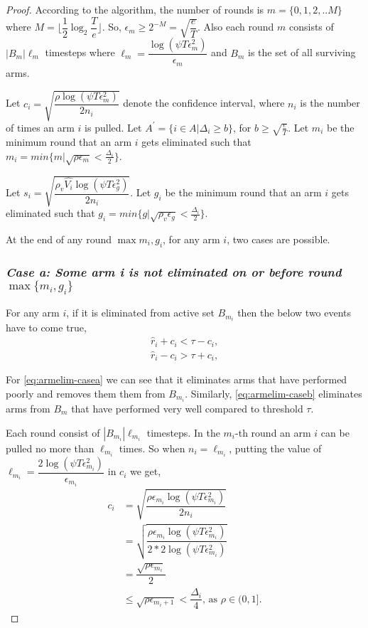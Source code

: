 \begin{proof}

According to the algorithm, the number of rounds is $m=\lbrace 0,1,2,.. M\rbrace $ where $M=\bigg\lfloor \dfrac{1}{2}\log_{2} \dfrac{T}{e}\bigg\rfloor$. So, $\epsilon_{m}\geq 2^{-M} = \sqrt{\dfrac{e}{T}}$. Also each round $m$ consists of $|B_{m}|\ell_{m}$ timesteps where $\ell_{m} = \dfrac{\log(\psi T \epsilon_{m}^{2})}{\epsilon_{m}}$ and $B_{m}$ is the set of all surviving arms. 

Let $c_{i} = \sqrt{\dfrac{\rho\log{(\psi T\epsilon_{m}^{2})}}{2 n_{i}}}$ denote the confidence interval, where $n_{i}$ is the number of times an arm $i$ is pulled. Let $A^{'}=\lbrace i\in A|\Delta_{i}\geq b\rbrace$, for $b\geq \sqrt{\frac{e}{T}}$. Let $m_{i}$ be the minimum round that an arm $i$ gets eliminated such that $m_{i}=min\lbrace m| \sqrt{\rho\epsilon_{m}}<\frac{\Delta_{i}}{2}\rbrace$. 


Let $s_{i}=\sqrt{\dfrac{\rho_v \hat{V_{i}} \log{(\psi T\epsilon_{g}^{2})}}{2 n_{i}}}$. Let $g_{i}$ be the minimum round that an arm $i$ gets eliminated such that $g_{i}=min\lbrace g| \sqrt{\rho_{v}\epsilon_{g}}<\frac{\Delta_{i}}{2}\rbrace$. 

At the end of any round $\max{m_{i},g_{i}}$, for any arm $i$, two cases are possible.

\subsubsection{\textit{Case a: Some arm i is not eliminated on or before round $\max\lbrace m_{i},g_{i}\rbrace$}}
For any arm $i$, if it is eliminated from active set $B_{m_{i}}$ then the below two events have to come true,
\begin{align}
\hat{r}_{i} + c_{i} < \tau - c_{i}, \label{eq:armelim-casea}\\
\hat{r}_{i} - c_{i} > \tau + c_{i}, \label{eq:armelim-caseb}
\end{align}

For \ref{eq:armelim-casea} we can see that it eliminates arms that have performed poorly and removes them them from $B_{m_{i}}$. Similarly, \ref{eq:armelim-caseb} eliminates arms from $B_{m}$ that have performed very well compared to threshold $\tau$.

Each round consist of $|B_{m_{i}}|\ell_{m_{i}}$ timesteps. In the $m_{i}$-th round an arm $i$ can be pulled no more than $\ell_{m_{i}}$ times. So when $n_{i}=\ell_{m_{i}}$, putting the value of $\ell_{m_{i}}=\dfrac{2\log{(\psi T\epsilon_{m_{i}}^{2})}}{\epsilon_{m_{i}}}$ in $c_{i}$ we get, 
\begin{align*}
c_{i}&=\sqrt{\dfrac{\rho\epsilon_{m_{i}}\log (\psi T\epsilon_{m_{i}}^{2})}{2 n_{i}}}\\
&=\sqrt{\dfrac{\rho\epsilon_{m_{i}}\log (\psi T\epsilon_{m_{i}}^{2})}{2*2 \log(\psi T\epsilon_{m_{i}}^{2})}}\\
& =\dfrac{\sqrt{\rho\epsilon_{m_{i}}}}{2}\\
& \leq \sqrt{\rho\epsilon_{m_{i}+1}} < \dfrac{\Delta_{i}}{4} \text{, as }\rho\in (0,1].
\end{align*}


\end{proof}
